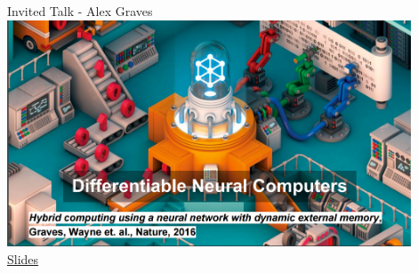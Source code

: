 \documentclass[]{beamer}
\begin{document}
%
%
%
%

\begin{frame}{Invited Talk - Alex Graves}
\centering
\includegraphics[width=0.9\textwidth]{figures/graves-nature} \\
\href{http://iclr.cc/lib/exe/fetch.php?media=iclr2017:graves\_iclr2017.pdf}{Slides}
\end{frame}
\end{document}
